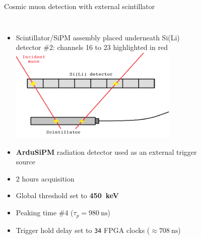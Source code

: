 \documentclass[aspectratio=169,xcolor=dvipsnames]{beamer} %
\begin{document}
\begin{frame}{Cosmic muon detection with external scintillator}
    \addtolength{\leftmargini}{\labelsep}
    \fontsize{9pt}{1}\selectfont
    \begin{columns}
        \begin{itemize}
            \item Scintillator/SiPM assembly placed underneath Si(Li) detector \#2: channels 16 to 23 highlighted in red
            \vskip0.4cm
            \includegraphics[width=0.8\textwidth]{images/muon_detection/scintillator_sensor_detail.png}
            \vskip0.4cm
            \item \textbf{ArduSiPM} radiation detector used as an external trigger source
            \item 2 hours acquisition
            \item Global threshold set to \textbf{\SI{450}{\kilo\electronvolt}}
            \item Peaking time \#4 ($\tau_{p} = \SI{980}{\nano\second}$)
            \item Trigger hold delay set to \texttt{34} FPGA clocks ($\approx \SI{708}{\nano\second}$)
        \end{itemize}
            \vskip-0.2cm
            \begin{figure}[h!]
                \centering
                \begin{tabular}{c c}

\end{tabular}
\end{figure}
\end{columns}
\end{frame}
\end{document}
